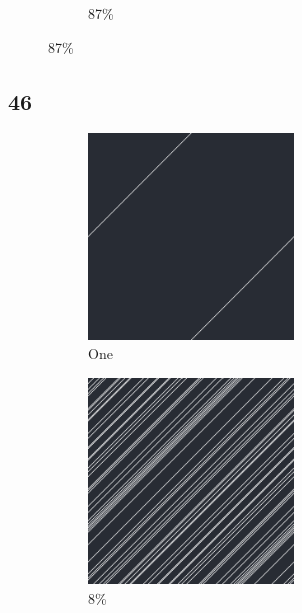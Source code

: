 \documentclass[12pt, fleqn]{report}                             %
\theoremstyle{break}                                            %
\begin{document}
\begin{figure}[ht!]
\begin{subfigure}[b]{0.4\linewidth}
          \caption{87\%}
        \end{subfigure}
      \end{figure}


      \clearpage
      \subsection{46}
      \begin{figure}[ht!]
        \centering
        \begin{subfigure}[b]{0.4\linewidth}
          \includegraphics[width=0.6\textwidth]{Images/46/a.png}
          \caption{One}
        \end{subfigure}
        \begin{subfigure}[b]{0.4\linewidth}
          \includegraphics[width=0.6\textwidth]{Images/46/b.png}
          \caption{8\%}
        \end{subfigure}
        \begin{subfigure}[b]{0.4\linewidth}

\end{subfigure}
\end{figure}
\end{document}

